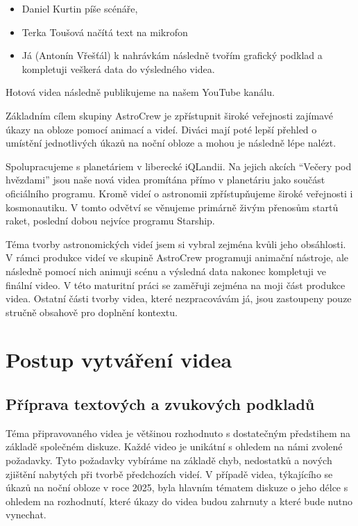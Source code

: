 \documentclass[12pt,a4paper,titlepage]{article}
\begin{document}
\begin{itemize}
	\item Daniel Kurtin píše scénáře,
	\item Terka Toušová načítá text na mikrofon
	\item Já (Antonín Vřešťál) k nahrávkám následně tvořím grafický podklad a kompletuji veškerá data do výsledného videa.
\end{itemize}
Hotová videa následně publikujeme na našem YouTube kanálu. 

Základním cílem skupiny AstroCrew je zpřístupnit široké veřejnosti zajímavé úkazy na obloze pomocí animací a videí. Diváci mají poté lepší přehled o umístění jednotlivých úkazů na noční obloze a mohou je následně lépe nalézt.

Spolupracujeme s planetáriem v liberecké iQLandii. Na jejich akcích \enquote{Večery pod hvězdami} jsou naše nová videa promítána přímo v planetáriu jako součást oficiálního programu. Kromě videí o astronomii zpřístupňujeme široké veřejnosti i kosmonautiku. V tomto odvětví se věnujeme primárně živým přenosům startů raket, poslední dobou nejvíce programu Starship.

Téma tvorby astronomických videí jsem si vybral zejména kvůli jeho obsáhlosti. V rámci produkce videí ve skupině AstroCrew programuji animační nástroje, ale následně pomocí nich animuji scénu a výsledná data nakonec kompletuji ve finální video. V této maturitní práci se zaměřuji zejména na moji část produkce videa. Ostatní části tvorby videa, které nezpracovávám já, jsou zastoupeny pouze stručně obsahově pro doplnění kontextu. 
\section{Postup vytváření videa}\label{makingof}
\subsection{Příprava textových a zvukových podkladů}\label{makingof:text-audio-prep}
Téma připravovaného videa je většinou rozhodnuto s dostatečným předstihem na základě společném diskuze. Každé video je unikátní s ohledem na námi zvolené požadavky. Tyto požadavky vybíráme na základě chyb, nedostatků a nových zjištění nabytých při tvorbě předchozích videí. V případě videa, týkajícího se úkazů na noční obloze v roce 2025, byla hlavním tématem diskuze o jeho délce s ohledem na rozhodnutí, které úkazy do videa budou zahrnuty a které bude nutno vynechat.
\end{document}

